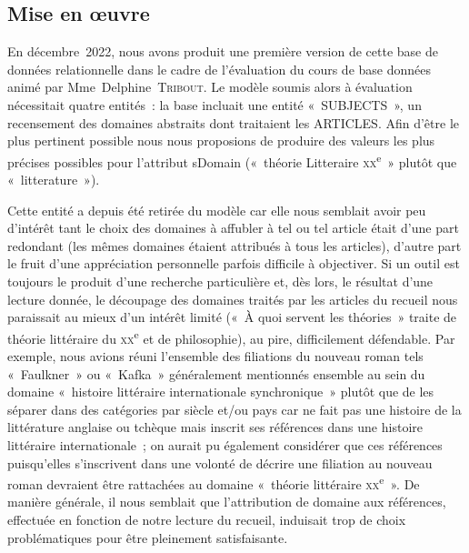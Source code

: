 \documentclass[12pt, a4paper]{article}
\begin{document}
   




    \subsection{Mise en œuvre}

    En décembre~2022, nous avons produit une première version de cette base de données relationnelle dans le cadre de l'évaluation du cours de base données animé par Mme~Delphine~\textsc{Tribout}. Le modèle soumis alors à évaluation nécessitait quatre entités~: la base incluait une entité «~SUBJECTS~», un recensement des domaines abstraits dont traitaient les ARTICLES. Afin d'être le plus pertinent possible nous nous proposions de produire des valeurs les plus précises possibles pour l'attribut sDomain («~théorie Litteraire \textsc{xx}\textsuperscript{e}~» plutôt que «~litterature~»).

    Cette entité a depuis été retirée du modèle car elle nous semblait avoir peu d'intérêt tant le choix des domaines à affubler à tel ou tel article était d'une part redondant (les mêmes domaines étaient attribués à tous les articles), d'autre part le fruit d'une appréciation personnelle parfois difficile à objectiver. Si un outil est toujours le produit d'une recherche particulière et, dès lors, le résultat d'une lecture donnée, le découpage des domaines traités par les articles du recueil nous paraissait au mieux d'un intérêt limité («~À quoi servent les théories~» traite de théorie littéraire du \textsc{xx}\textsuperscript{e} et de philosophie), au pire, difficilement défendable. Par exemple, nous avions réuni l'ensemble des filiations du nouveau roman tels «~Faulkner~» ou «~Kafka~» généralement mentionnés ensemble au sein du domaine «~histoire littéraire internationale synchronique~» plutôt que de les séparer dans des catégories par siècle et/ou pays car \robbe{} ne fait pas une histoire de la littérature anglaise ou tchèque mais inscrit ses références dans une histoire littéraire internationale~; on aurait pu également considérer que ces références puisqu'elles s'inscrivent dans une volonté de décrire une filiation au nouveau roman devraient être rattachées au domaine «~théorie littéraire \textsc{xx}\textsuperscript{e}~». De manière générale, il nous semblait que l'attribution de domaine aux références, effectuée en fonction de notre lecture du recueil, induisait trop de choix problématiques pour être pleinement satisfaisante.



    
\end{document}

